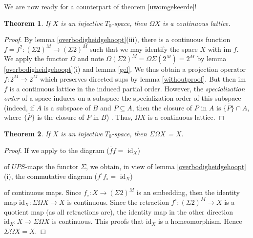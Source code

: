 \documentclass[a4paper,12pt]{article}
\newtheorem{theorem}{Theorem}[section]
\begin{document}
We are now ready for a counterpart of theorem \ref{uwomgekeerde}!
\begin{theorem}
If $X$ is an injective $T_0$-space, then $\Omega X$ is a continuous lattice.
\end{theorem}
\begin{proof}
By lemma \ref{overbodigheidgehoopt}(iii), there is a continuous function $f = f^2: (\Sigma 2)^M \to (\Sigma 2)^M$ such that we may identify the space $X$ with im $f$. We apply the functor $\Omega$ and note $\Omega(\Sigma 2)^M = \Omega\Sigma(2^M) = 2^M$ by lemma \ref{overbodigheidgehoopt}(i) and lemma \ref{gel}. We thus obtain a projection operator $f: 2^M \to 2^M$ which preserves directed sups by lemma \ref{withoutproof}. But then im $f$ is a continuous lattice in the induced partial order. However, the \emph{specialization order} of a space induces on a subspace the specialization order of this subspace (indeed, if $A$ is a subspace of $B$ and $P \subseteq A$, then the closure of $P$ in $A$ is $\overline{\{P\}} \cap A$, where $\overline{\{P\}}$ is the closure of $P$ in $B$) . Thus, $\Omega X$ is a continuous lattice.
\end{proof}

\begin{theorem}
If $X$ is an injective $T_0$-space, then $\Sigma\Omega X$ = $X$.
\end{theorem}

\begin{proof}
If we apply to the diagram ($\overline{f}\underline{f} = \text{ id}_X$)
 \begin{center}
 \end{center}
of $UPS$-maps the functor $\Sigma$, we obtain, in view of lemma \ref{overbodigheidgehoopt}(i), the commutative diagram ($f^\circ f_\circ = \text{ id}_X$)
 \begin{center}
 \end{center}
 of continuous maps. Since $f_\circ: X \to (\Sigma 2)^M$ is an embedding, then the identity map $\text{id}_X: \Sigma\Omega X \to X$ is continuous. Since the retraction $f^\circ: (\Sigma 2)^M \to X$ is a quotient map (as all retractions are), the identity map in the other direction $\text{id}_X: X \to \Sigma\Omega X$ is continuous. This proofs that $\text{id}_X$ is a homeomorphism. Hence $\Sigma\Omega X = X$.
\end{proof}
\end{document}
